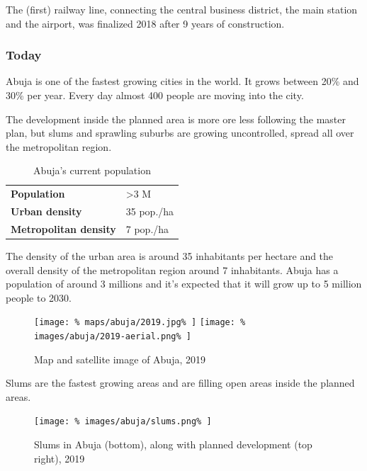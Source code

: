 \documentclass{article}
\begin{document}
\begin{multicols}{2}
			The (first) railway line, connecting the central business district, the main station and the airport, was finalized 2018 after 9 years of construction.
			
			
			\subsubsection{Today}
			
			Abuja is one of the fastest growing cities in the world. It grows between 20\% and 30\% per year. Every day almost 400 people are moving into the city.
			
			The development inside the planned area is more ore less following the master plan, but slums and sprawling suburbs are growing uncontrolled, spread all over the metropolitan region.
			
			\begin{table}[H]			
				\centering
				\caption{Abuja's current population}
				\label{table:abuja-population}
				\begin{tabular}{|l|l|}
					\hline
					\textbf{Population}           & \textgreater 3 M \\
					\textbf{Urban density}        & 35 pop./ha \\
					\textbf{Metropolitan density} & 7 pop./ha \\
					\hline
				\end{tabular}
			\end{table}
			
			The density of the urban area is around 35 inhabitants per hectare and the overall density of the metropolitan region around 7 inhabitants.
			Abuja has a population of around 3 millions and it's expected that it will grow up to 5 million people to 2030.
			
			\begin{figure}[H]			
				\texttt{[image: \%
					maps/abuja/2019.jpg\%
				]}
				\texttt{[image: \%
					images/abuja/2019-aerial.png\%
				]}
				\caption{Map \cite{OpenStreetMap:Abuja} and satellite image  \cite{Satellites.pro:Abuja} of Abuja, 2019}
				\label{fig:map:abuja-map-satellite-2019}
			\end{figure}
			
			Slums are the fastest growing areas and are  filling open areas inside the planned areas.
			
			\begin{figure}[H]
				\texttt{[image: \%
					images/abuja/slums.png\%
				]}
				\caption{Slums in Abuja (bottom), along with planned development (top right), 2019 \cite{Satellites.pro:Abuja}}
				\label{fig:images:abuja-slums}
			\end{figure}
			

\end{multicols}
\end{document}
